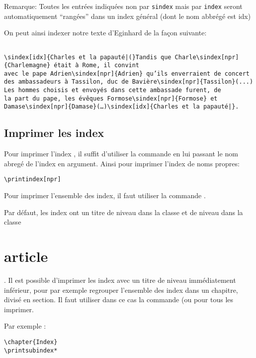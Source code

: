 Remarque: Toutes les entrées indiquées non par \verb|sindex| mais par \verb|index| seront automatiquement \enquote{rangées} dans un index général (dont le nom abbrégé est idx)

On peut ainsi indexer notre texte d'Eginhard de la façon suivante:

\begin{verbatim}

\sindex[idx]{Charles et la papauté|(}Tandis que Charle\sindex[npr]{Charlemagne} était à Rome, il convint
avec le pape Adrien\sindex[npr]{Adrien} qu’ils enverraient de concert
des ambassadeurs à Tassilon, duc de Bavière\sindex[npr]{Tassilon}(...)
Les hommes choisis et envoyés dans cette ambassade furent, de 
la part du pape, les évêques Formose\sindex[npr]{Formose} et 
Damase\sindex[npr]{Damase}(…)\sindex[idx]{Charles et la papauté|}.

\end{verbatim}


\subsection{Imprimer les index}

Pour imprimer l'index , il suffit d'utiliser la commande  en lui passant le nom abregé de l'index en argument. Ainsi pour imprimer l'index de noms propres:

\begin{verbatim}
\printindex[npr]
\end{verbatim}

Pour imprimer l'ensemble des index, il faut utiliser la commande .

Par défaut, les index ont un titre de niveau  dans la classe  et de niveau  dans la classe \section{article}. Il est possible d'imprimer les index avec un titre de niveau immédiatement inférieur, pour par exemple regrouper l'ensemble des index dans un chapitre, divisé en section. Il faut utiliser dans ce cas la commande  (ou  pour tous les imprimer.

Par exemple :

\begin{verbatim}
\chapter{Index}
\printsubindex*
\end{verbatim}




